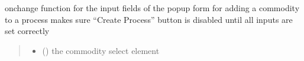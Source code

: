 \documentclass[letterpaper,10pt,english]{sphinxmanual}
\begin{document}

\begin{fulllineitems}
\label{\detokenize{docs_gui/js_api/urbs_editor/process_editor:processAddCommoditySelection}}
\pysigstartsignatures
{}
\pysigstopsignatures
\sphinxAtStartPar
onchange function for the input fields of the popup form for adding a commodity to a process
makes sure “Create Process” button is disabled until all inputs are set correctly
\begin{quote}\begin{description}
\begin{itemize}
\item {} 
\sphinxAtStartPar
{} () \textendash{} the commodity select element

\end{itemize}

\end{description}\end{quote}

\end{fulllineitems}

\end{document}
